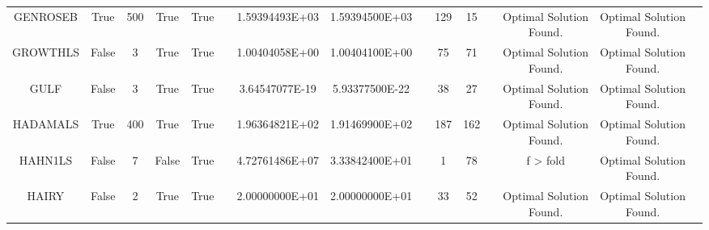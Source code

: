 \begin{longtable}{ccccccccccccccc}
	\cellcolor{default2} GENROSEB& \cellcolor{default2} True& \cellcolor{default2} 500& \cellcolor{default2} True& \cellcolor{default2} True& \cellcolor{header} & \cellcolor{best} 1.59394493E+03& \cellcolor{ok} 1.59394500E+03& \cellcolor{header} & \cellcolor{poor} 129& \cellcolor{best} 15& \cellcolor{header} & \cellcolor{default2} Optimal Solution Found.& \cellcolor{default2} Optimal Solution Found.& \cellcolor{header} \\
	\cellcolor{default1} GROWTHLS& \cellcolor{default1} False& \cellcolor{default1} 3& \cellcolor{default1} True& \cellcolor{default1} True& \cellcolor{header} & \cellcolor{best} 1.00404058E+00& \cellcolor{ok} 1.00404100E+00& \cellcolor{header} & \cellcolor{ok} 75& \cellcolor{best} 71& \cellcolor{header} & \cellcolor{default1} Optimal Solution Found.& \cellcolor{default1} Optimal Solution Found.& \cellcolor{header} \\
	\cellcolor{default2} GULF& \cellcolor{default2} False& \cellcolor{default2} 3& \cellcolor{default2} True& \cellcolor{default2} True& \cellcolor{header} & \cellcolor{ok} 3.64547077E-19& \cellcolor{best} 5.93377500E-22& \cellcolor{header} & \cellcolor{ok} 38& \cellcolor{best} 27& \cellcolor{header} & \cellcolor{default2} Optimal Solution Found.& \cellcolor{default2} Optimal Solution Found.& \cellcolor{header} \\
	\cellcolor{default1} HADAMALS& \cellcolor{default1} True& \cellcolor{default1} 400& \cellcolor{default1} True& \cellcolor{default1} True& \cellcolor{header} & \cellcolor{poor} 1.96364821E+02& \cellcolor{best} 1.91469900E+02& \cellcolor{header} & \cellcolor{ok} 187& \cellcolor{best} 162& \cellcolor{header} & \cellcolor{default1} Optimal Solution Found.& \cellcolor{default1} Optimal Solution Found.& \cellcolor{header} \\
	\cellcolor{default2} HAHN1LS& \cellcolor{default2} False& \cellcolor{default2} 7& \cellcolor{default2} False& \cellcolor{default2} True& \cellcolor{header} & \cellcolor{poor} 4.72761486E+07& \cellcolor{best} 3.33842400E+01& \cellcolor{header} & \cellcolor{best} 1& \cellcolor{poor} 78& \cellcolor{header} & \cellcolor{default2} f > fold& \cellcolor{default2} Optimal Solution Found.& \cellcolor{header} \\
	\cellcolor{default1} HAIRY& \cellcolor{default1} False& \cellcolor{default1} 2& \cellcolor{default1} True& \cellcolor{default1} True& \cellcolor{header} & \cellcolor{best} 2.00000000E+01& \cellcolor{best} 2.00000000E+01& \cellcolor{header} & \cellcolor{best} 33& \cellcolor{ok} 52& \cellcolor{header} & \cellcolor{default1} Optimal Solution Found.& \cellcolor{default1} Optimal Solution Found.& \cellcolor{header} \\

\end{longtable}
